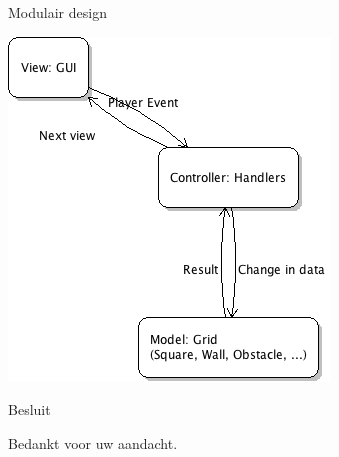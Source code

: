 \documentclass[t]{beamer}
\begin{document}
\begin{frame}[plain]{Modulair design}
\begin{center}
\includegraphics[width= 0.5\linewidth]{../uml/MVC.png}
\end{center}
\end{frame}

\begin{frame}{Besluit}
\vspace{0.8in}
\begin{center}
Bedankt voor uw aandacht.
\end{center}
\end{frame}
\end{document}
